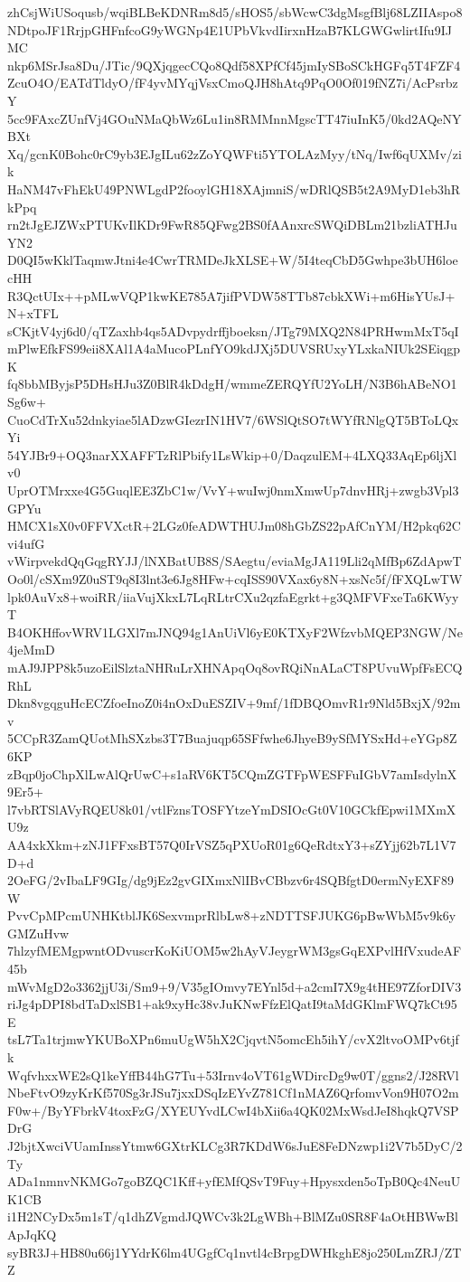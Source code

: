 zhCsjWiUSoqusb/wqiBLBeKDNRm8d5/sHOS5/sbWcwC3dgMsgfBlj68LZIIAspo8
NDtpoJF1RrjpGHFnfcoG9yWGNp4E1UPbVkvdIirxnHzaB7KLGWGwlirtIfu9IJMC
nkp6MSrJsa8Du/JTic/9QXjqgecCQo8Qdf58XPfCf45jmIySBoSCkHGFq5T4FZF4
ZcuO4O/EATdTldyO/fF4yvMYqjVsxCmoQJH8hAtq9PqO0Of019fNZ7i/AcPsrbzY
5cc9FAxcZUnfVj4GOuNMaQbWz6Lu1in8RMMnnMgscTT47iuInK5/0kd2AQeNYBXt
Xq/gcnK0Bohc0rC9yb3EJgILu62zZoYQWFti5YTOLAzMyy/tNq/Iwf6qUXMv/zik
HaNM47vFhEkU49PNWLgdP2fooylGH18XAjmniS/wDRlQSB5t2A9MyD1eb3hRkPpq
rn2tJgEJZWxPTUKvIlKDr9FwR85QFwg2BS0fAAnxrcSWQiDBLm21bzliATHJuYN2
D0QI5wKklTaqmwJtni4e4CwrTRMDeJkXLSE+W/5I4teqCbD5Gwhpe3bUH6loecHH
R3QctUIx++pMLwVQP1kwKE785A7jifPVDW58TTb87cbkXWi+m6HisYUsJ+N+xTFL
sCKjtV4yj6d0/qTZaxhb4qs5ADvpydrffjboeksn/JTg79MXQ2N84PRHwmMxT5qI
mPlwEfkFS99eii8XAl1A4aMucoPLnfYO9kdJXj5DUVSRUxyYLxkaNIUk2SEiqgpK
fq8bbMByjsP5DHsHJu3Z0BlR4kDdgH/wmmeZERQYfU2YoLH/N3B6hABeNO1Sg6w+
CuoCdTrXu52dnkyiae5lADzwGIezrIN1HV7/6WSlQtSO7tWYfRNlgQT5BToLQxYi
54YJBr9+OQ3narXXAFFTzRlPbify1LsWkip+0/DaqzulEM+4LXQ33AqEp6ljXlv0
UprOTMrxxe4G5GuqlEE3ZbC1w/VvY+wuIwj0nmXmwUp7dnvHRj+zwgb3Vpl3GPYu
HMCX1sX0v0FFVXctR+2LGz0feADWTHUJm08hGbZS22pAfCnYM/H2pkq62Cvi4ufG
vWirpvekdQqGqgRYJJ/lNXBatUB8S/SAegtu/eviaMgJA119Lli2qMfBp6ZdApwT
Oo0l/cSXm9Z0uST9q8I3lnt3e6Jg8HFw+cqISS90VXax6y8N+xsNc5f/fFXQLwTW
lpk0AuVx8+woiRR/iiaVujXkxL7LqRLtrCXu2qzfaEgrkt+g3QMFVFxeTa6KWyyT
B4OKHffovWRV1LGXl7mJNQ94g1AnUiVl6yE0KTXyF2WfzvbMQEP3NGW/Ne4jeMmD
mAJ9JPP8k5uzoEilSlztaNHRuLrXHNApqOq8ovRQiNnALaCT8PUvuWpfFsECQRhL
Dkn8vgqguHcECZfoeInoZ0i4nOxDuESZIV+9mf/1fDBQOmvR1r9Nld5BxjX/92mv
5CCpR3ZamQUotMhSXzbs3T7Buajuqp65SFfwhe6JhyeB9ySfMYSxHd+eYGp8Z6KP
zBqp0joChpXlLwAlQrUwC+s1aRV6KT5CQmZGTFpWESFFuIGbV7amIsdylnX9Er5+
l7vbRTSlAVyRQEU8k01/vtlFznsTOSFYtzeYmDSIOcGt0V10GCkfEpwi1MXmXU9z
AA4xkXkm+zNJ1FFxsBT57Q0IrVSZ5qPXUoR01g6QeRdtxY3+sZYjj62b7L1V7D+d
2OeFG/2vIbaLF9GIg/dg9jEz2gvGIXmxNlIBvCBbzv6r4SQBfgtD0ermNyEXF89W
PvvCpMPcmUNHKtblJK6SexvmprRlbLw8+zNDTTSFJUKG6pBwWbM5v9k6yGMZuHvw
7hlzyfMEMgpwntODvuscrKoKiUOM5w2hAyVJeygrWM3gsGqEXPvlHfVxudeAF45b
mWvMgD2o3362jjU3i/Sm9+9/V35gIOmvy7EYnl5d+a2cmI7X9g4tHE97ZforDIV3
riJg4pDPI8bdTaDxlSB1+ak9xyHc38vJuKNwFfzElQatI9taMdGKlmFWQ7kCt95E
tsL7Ta1trjmwYKUBoXPn6muUgW5hX2CjqvtN5omcEh5ihY/cvX2ltvoOMPv6tjfk
WqfvhxxWE2sQ1keYffB44hG7Tu+53Irnv4oVT61gWDircDg9w0T/ggns2/J28RVl
NbeFtvO9zyKrKf570Sg3rJSu7jxxDSqIzEYvZ781Cf1nMAZ6QrfomvVon9H07O2m
F0w+/ByYFbrkV4toxFzG/XYEUYvdLCwI4bXii6a4QK02MxWsdJeI8hqkQ7VSPDrG
J2bjtXwciVUamInssYtmw6GXtrKLCg3R7KDdW6sJuE8FeDNzwp1i2V7b5DyC/2Ty
ADa1nmnvNKMGo7goBZQC1Kff+yfEMfQSvT9Fuy+Hpysxden5oTpB0Qc4NeuUK1CB
i1H2NCyDx5m1sT/q1dhZVgmdJQWCv3k2LgWBh+BlMZu0SR8F4aOtHBWwBlApJqKQ
syBR3J+HB80u66j1YYdrK6lm4UGgfCq1nvtl4cBrpgDWHkghE8jo250LmZRJ/ZTZ
